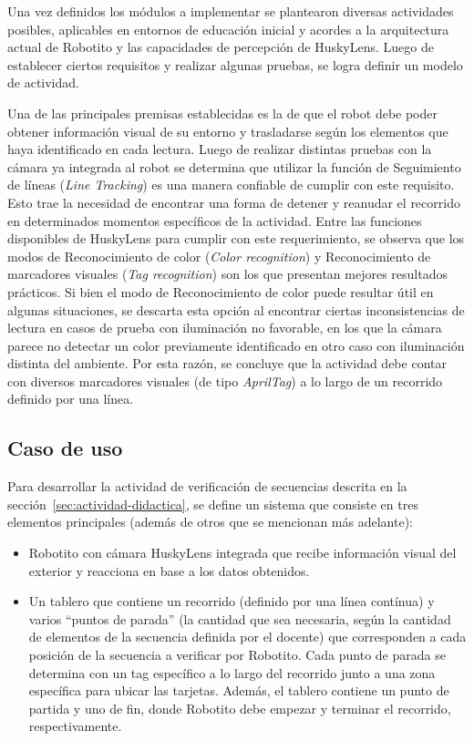 \documentclass{prgrado}
\begin{document}
Una vez definidos los módulos a implementar se plantearon diversas actividades posibles, aplicables en entornos de educación inicial y acordes a la arquitectura actual de Robotito y las capacidades de percepción de HuskyLens. Luego de establecer ciertos requisitos y realizar algunas pruebas, se logra definir un modelo de actividad.

Una de las principales premisas establecidas es la de que el robot debe poder obtener información visual de su entorno y trasladarse según los elementos que haya identificado en cada lectura. Luego de realizar distintas pruebas con la cámara ya integrada al robot se determina que utilizar la función de Seguimiento de líneas (\textit{Line Tracking}) es una manera confiable de cumplir con este requisito. Esto trae la necesidad de encontrar una forma de detener y reanudar el recorrido en determinados momentos específicos de la actividad. Entre las funciones disponibles de HuskyLens para cumplir con este requerimiento, se observa que los modos de Reconocimiento de color (\textit{Color recognition}) y Reconocimiento de marcadores visuales (\textit{Tag recognition}) son los que presentan mejores resultados prácticos. Si bien el modo de Reconocimiento de color puede resultar útil en algunas situaciones, se descarta esta opción al encontrar ciertas inconsistencias de lectura en casos de prueba con iluminación no favorable, en los que la cámara parece no detectar un color previamente identificado en otro caso con iluminación distinta del ambiente. Por esta razón, se concluye que la actividad debe contar con diversos marcadores visuales (de tipo \textit{AprilTag}) a lo largo de un recorrido definido por una línea.

\subsection{Caso de uso}

Para desarrollar la actividad de verificación de secuencias descrita en la sección~\ref{sec:actividad-didactica}, se define un sistema que consiste en tres elementos principales (además de otros que se mencionan más adelante):

\begin{itemize}
    \item Robotito con cámara HuskyLens integrada que recibe información visual del exterior y reacciona en base a los datos obtenidos.
\end{itemize}

\begin{itemize}
    \item Un tablero que contiene un recorrido (definido por una línea contínua) y varios ``puntos de parada'' (la cantidad que sea necesaria, según la cantidad de elementos de la secuencia definida por el docente) que corresponden a cada posición de la secuencia a verificar por Robotito. Cada punto de parada se determina con un tag específico a lo largo del recorrido junto a una zona específica para ubicar las tarjetas. Además, el tablero contiene un punto de partida y uno de fin, donde Robotito debe empezar y terminar el recorrido, respectivamente.
\end{itemize}
\end{document}
